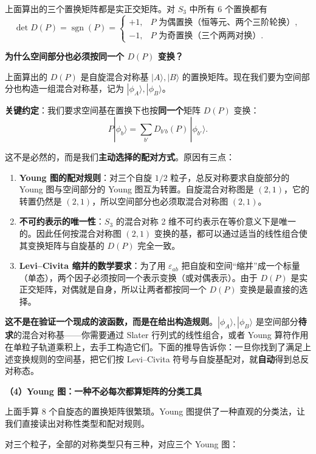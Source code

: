 上面算出的三个置换矩阵都是实正交矩阵。对 $S_3$ 中所有 $6$ 个置换都有
\[
\boxed{\det D(P)=\operatorname{sgn}(P)}=
\begin{cases}
+1, & P\text{ 为偶置换（恒等元、两个三阶轮换）},\\
-1, & P\text{ 为奇置换（三个两两对换）}.
\end{cases}
\]

\textbf{为什么空间部分也必须按同一个 $D(P)$ 变换？}

上面算出的 $D(P)$ 是自旋混合对称基 $|A\rangle,|B\rangle$ 的置换矩阵。现在我们要为空间部分也构造一组混合对称基，记为 $|\phi_A\rangle,|\phi_B\rangle$。

\textbf{关键约定}：我们要求空间基在置换下也按\textbf{同一个}矩阵 $D(P)$ 变换：
\[
P|\phi_b\rangle=\sum_{b'}D_{b'b}(P)\,|\phi_{b'}\rangle.
\]

这不是必然的，而是我们\textbf{主动选择的配对方式}。原因有三点：
\begin{enumerate}[nosep]
    \item \textbf{Young 图的配对规则}：对三个自旋 $1/2$ 粒子，总反对称要求自旋部分的 Young 图与空间部分的 Young 图互为转置。自旋混合对称图是 $(2,1)$，它的转置仍然是 $(2,1)$，所以空间部分也必须取混合对称图 $(2,1)$。
    \item \textbf{不可约表示的唯一性}：$S_3$ 的混合对称 2 维不可约表示在等价意义下是唯一的。因此任何按混合对称图 $(2,1)$ 变换的基，都可以通过适当的线性组合使其变换矩阵与自旋基的 $D(P)$ 完全一致。
    \item \textbf{Levi--Civita 缩并的数学要求}：为了用 $\varepsilon_{ab}$ 把自旋和空间``缩并''成一个标量（单态），两个因子必须按同一个表示变换（或对偶表示）。由于 $D(P)$ 是实正交矩阵，对偶就是自身，所以让两者都按同一个 $D(P)$ 变换是最直接的选择。
\end{enumerate}

\textbf{这不是在验证一个现成的波函数，而是在给出构造规则}。$|\phi_A\rangle,|\phi_B\rangle$ 是空间部分\textbf{待求}的混合对称基——你需要通过 Slater 行列式的线性组合，或者 Young 算符作用在单粒子轨道乘积上，去手工构造它们。下面的推导告诉你：一旦你找到了满足上述变换规则的空间基，把它们按 Levi--Civita 符号与自旋基配对，就\textbf{自动}得到总反对称态。

\textbf{（4）Young 图：一种不必每次都算矩阵的分类工具}

上面手算 $8$ 个自旋态的置换矩阵很繁琐。Young 图提供了一种直观的分类法，让我们直接读出对称性类型和配对规则。

对三个粒子，全部的对称类型只有三种，对应三个 Young 图：

